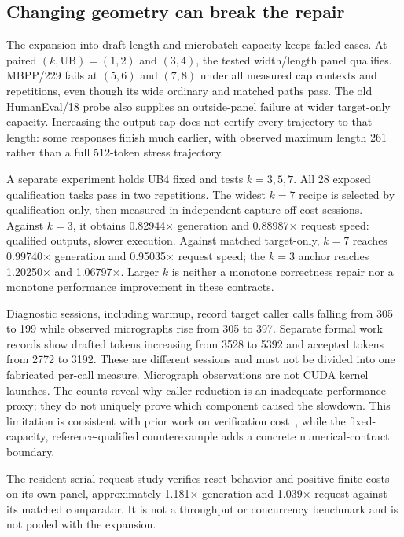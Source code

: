 \documentclass{article}
\begin{document}
\subsection{Changing geometry can break the repair}
The expansion into draft length and microbatch capacity keeps failed cases. At paired $(k,\mathrm{UB})=(1,2)$ and $(3,4)$, the tested width/length panel qualifies. MBPP/229 fails at $(5,6)$ and $(7,8)$ under all measured cap contexts and repetitions, even though its wide ordinary and matched paths pass. The old HumanEval/18 probe also supplies an outside-panel failure at wider target-only capacity. Increasing the output cap does not certify every trajectory to that length: some responses finish much earlier, with observed maximum length 261 rather than a full 512-token stress trajectory.

A separate experiment holds UB4 fixed and tests $k=3,5,7$. All 28 exposed qualification tasks pass in two repetitions. The widest $k=7$ recipe is selected by qualification only, then measured in independent capture-off cost sessions. Against $k=3$, it obtains 0.82944$\times$ generation and 0.88987$\times$ request speed: qualified outputs, slower execution. Against matched target-only, $k=7$ reaches 0.99740$\times$ generation and 0.95035$\times$ request speed; the $k=3$ anchor reaches 1.20250$\times$ and 1.06797$\times$. Larger $k$ is neither a monotone correctness repair nor a monotone performance improvement in these contracts.

Diagnostic sessions, including warmup, record target caller calls falling from 305 to 199 while observed micrographs rise from 305 to 397. Separate formal work records show drafted tokens increasing from 3528 to 5392 and accepted tokens from 2772 to 3192. These are different sessions and must not be divided into one fabricated per-call measure. Micrograph observations are not CUDA kernel launches. The counts reveal why caller reduction is an inadequate performance proxy; they do not uniquely prove which component caused the slowdown. This limitation is consistent with prior work on verification cost~\cite{illusion}, while the fixed-capacity, reference-qualified counterexample adds a concrete numerical-contract boundary.

The resident serial-request study verifies reset behavior and positive finite costs on its own panel, approximately 1.181$\times$ generation and 1.039$\times$ request against its matched comparator. It is not a throughput or concurrency benchmark and is not pooled with the expansion.
\end{document}
